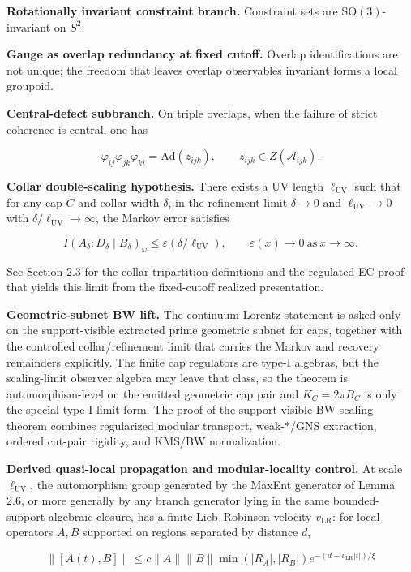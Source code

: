 \textbf{Rotationally invariant constraint branch.} Constraint sets are \(\mathrm{SO}(3)\)-invariant on \(S^2\).

\textbf{Gauge as overlap redundancy at fixed cutoff.} Overlap identifications are not unique; the freedom that leaves overlap observables invariant forms a local groupoid.

\textbf{Central-defect subbranch.} On triple overlaps, when the failure of strict coherence is central, one has

\[
\varphi_{ij} \varphi_{jk} \varphi_{ki} = \mathrm{Ad}(z_{ijk}),\qquad z_{ijk} \in Z(\mathcal{A}_{ijk}).
\]

\textbf{Collar double-scaling hypothesis.} There exists a UV length \(\ell_{\mathrm{UV}}\) such that for any cap \(C\) and collar width \(\delta\), in the refinement limit \(\delta \to 0\) and \(\ell_{\mathrm{UV}} \to 0\) with \(\delta/\ell_{\mathrm{UV}} \to \infty\), the Markov error satisfies

\[
I(A_\delta:D_\delta \mid B_\delta)_\omega \le \varepsilon(\delta/\ell_{\mathrm{UV}}),
\qquad \varepsilon(x) \to 0 \ \text{as} \ x \to \infty.
\]

See Section 2.3 for the collar tripartition definitions and the regulated EC proof that yields this limit from the fixed-cutoff realized presentation.

\textbf{Geometric-subnet BW lift.} The continuum Lorentz statement is asked only on the support-visible extracted prime geometric subnet for caps, together with the controlled collar/refinement limit that carries the Markov and recovery remainders explicitly. The finite cap regulators are type-I algebras, but the scaling-limit observer algebra may leave that class, so the theorem is automorphism-level on the emitted geometric cap pair and \(K_C=2\pi B_C\) is only the special type-I limit form. The proof of the support-visible BW scaling theorem combines regularized modular transport, weak-\(*\)/GNS extraction, ordered cut-pair rigidity, and KMS/BW normalization.

\textbf{Derived quasi-local propagation and modular-locality control.} At scale \(\ell_{\mathrm{UV}}\), the automorphism group generated by the MaxEnt generator of Lemma 2.6, or more generally by any branch generator lying in the same bounded-support algebraic closure, has a finite Lieb--Robinson velocity \(v_{\mathrm{LR}}\): for local operators \(A, B\) supported on regions separated by distance \(d\),

\[
\|[A(t), B]\| \le c \|A\| \|B\| \min(|R_A|, |R_B|) e^{-(d - v_{\mathrm{LR}}|t|)/\xi}
\]

